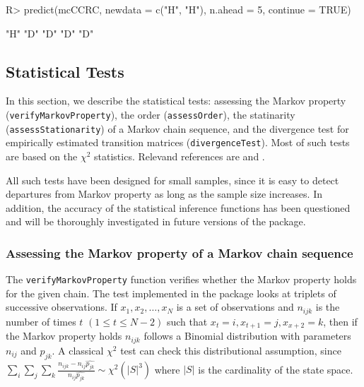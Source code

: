 \documentclass[
  nojss]{jss}
\begin{document}
\begin{CodeChunk}

\begin{CodeInput}
R> predict(mcCCRC, newdata = c("H", "H"), n.ahead = 5, continue = TRUE)
\end{CodeInput}

\begin{CodeOutput}
[1] "H" "D" "D" "D" "D"
\end{CodeOutput}
\end{CodeChunk}

\hypertarget{statistical-tests}{%
\subsection{Statistical Tests}\label{statistical-tests}}

In this section, we describe the statistical tests: assessing the Markov property (\texttt{verifyMarkovProperty}), the order (\texttt{assessOrder}), the statinarity (\texttt{assessStationarity}) of a Markov chain sequence, and the divergence test for empirically estimated transition matrices (\texttt{divergenceTest}). Most of such tests are based on the \(\chi ^2\) statistics. Relevand references are \cite{kullback1962tests} and \cite{anderson1957statistical}.

All such tests have been designed for small samples, since it is easy to detect departures from Markov property as long as the sample size increases. In addition, the accuracy of the statistical inference functions has been questioned and will be thoroughly investigated in future versions of the package.

\hypertarget{assessing-the-markov-property-of-a-markov-chain-sequence}{%
\subsubsection{Assessing the Markov property of a Markov chain sequence}\label{assessing-the-markov-property-of-a-markov-chain-sequence}}

The \texttt{verifyMarkovProperty} function verifies whether the Markov property holds for the given chain. The test implemented in the package looks at triplets of successive observations. If \(x_1, x_2, \ldots, x_N\) is a set of observations and \(n_{ijk}\) is the number of times \(t\) \(\left(1 \le t \le N-2 \right)\) such that \(x_t=i, x_{t+1}=j, x_{x+2}=k\), then if the Markov property holds \(n_{ijk}\) follows a Binomial distribution with parameters \(n_{ij}\) and \(p_{jk}\). A classical \(\chi^2\) test can check this distributional assumption, since \(\sum_{i}\sum_{j}\sum_{k}\frac{n_{ijk}-n_{ij}\hat{p_{jk}}}{n_{ij}\hat{p_{jk}}}\sim \chi^2\left(|S|^3 \right )\) where \(|S|\) is the cardinality of the state space.
\end{document}
